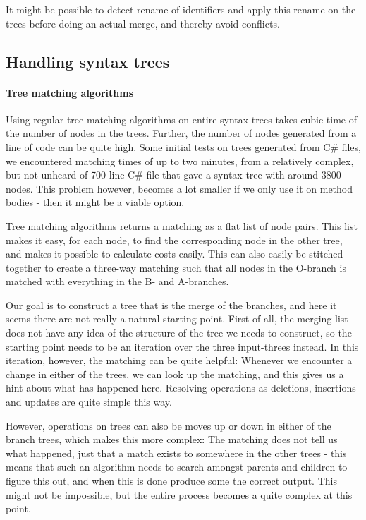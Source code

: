 \documentclass[11pt]{article}
\begin{document}
It might be possible to detect rename of identifiers and apply this rename on the trees before doing an actual merge, and thereby avoid conflicts.

\subsection{Handling syntax trees}
\paragraph{Tree matching algorithms} Using regular tree matching algorithms on entire syntax trees takes cubic time of the number of nodes in the trees. Further, the number of nodes generated from a line of code can be quite high. Some initial tests on trees generated from C\# files, we encountered matching times of up to two minutes, from a relatively complex, but not unheard of 700-line C\# file that gave a syntax tree with around 3800 nodes. This problem however, becomes a lot smaller if we only use it on method bodies - then it might be a viable option.

Tree matching algorithms returns a matching as a flat list of node pairs. This list makes it easy, for each node, to find the corresponding node in the other tree, and makes it possible to calculate costs easily. This can also easily be stitched together to create a three-way matching such that all nodes in the O-branch is matched with everything in the B- and A-branches.

Our goal is to construct a tree that is the merge of the branches, and here it seems there are not really a natural starting point. First of all, the merging list does not have any idea of the structure of the tree we needs to construct, so the starting point needs to be an iteration over the three input-threes instead. In this iteration, however, the matching can be quite helpful: Whenever we encounter a change in either of the trees, we can look up the matching, and this gives us a hint about what has happened here. Resolving operations as deletions, insertions and updates are quite simple this way.

However, operations on trees can also be moves up or down in either of the branch trees, which makes this more complex: The matching does not tell us what happened, just that a match exists to somewhere in the other trees - this means that such an algorithm needs to search amongst parents and children to figure this out, and when this is done produce some the correct output. This might not be impossible, but the entire process becomes a quite complex at this point. 
\end{document}
